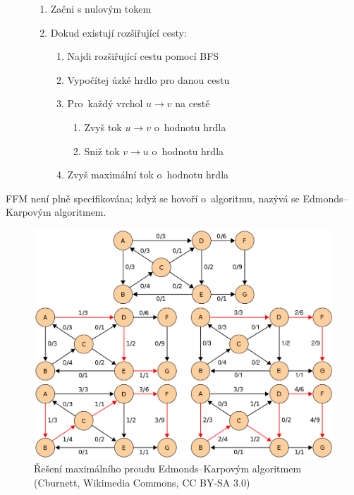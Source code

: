 \begin{figure}[ht]
\onehalfspacing
\begin{enumerate}
\item Začni s nulovým tokem
\item Dokud existují rozšiřující cesty:
    \begin{enumerate}
    \item Najdi rozšiřující cestu pomocí BFS
    \item Vypočítej úzké hrdlo pro danou cestu
    \item Pro~každý vrchol $u \rightarrow v$ na cestě
        \begin{enumerate}
        \item Zvyš tok $u \rightarrow v$ o~hodnotu hrdla
        \item Sniž tok $v \rightarrow u$ o~hodnotu hrdla
        \end{enumerate}
    \item Zvyš maximální tok o~hodnotu hrdla
    \end{enumerate}
\end{enumerate}
\end{figure}

FFM není plně specifikována; když se hovoří o~algoritmu, nazývá se Edmonds--Karpovým algoritmem.

\begin{figure}[ht]
\centering
\includegraphics[width=\textwidth]{images/5_edmonds-karp}
\caption[Řešení maximálního proudu Edmonds--Karpovým algoritmem]{Řešení maximálního proudu Edmonds--Karpovým algoritmem\\{\small (Cburnett, Wikimedia Commons, CC BY-SA 3.0)}}
\end{figure}
\FloatBarrier

